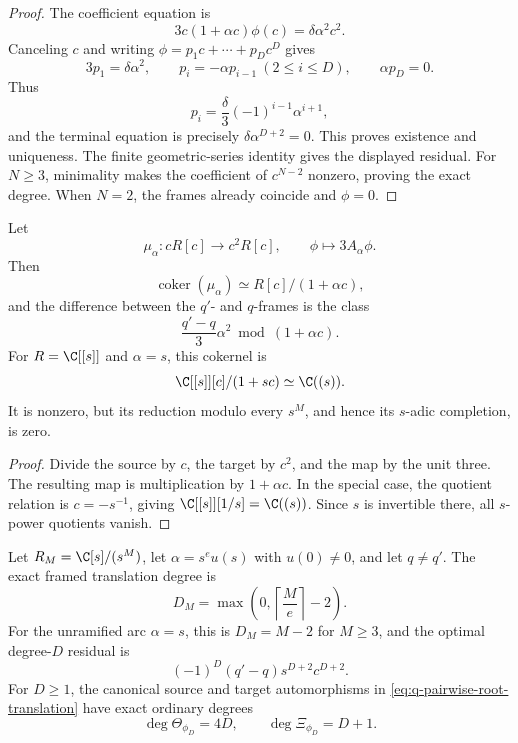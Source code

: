 \begin{proof}
The coefficient equation is
\[
 3c(1+\alpha c)\phi(c)=\delta\alpha^2c^2.
\]
Canceling \(c\) and writing
\(\phi=p_1c+\cdots+p_Dc^D\) gives
\[
 3p_1=\delta\alpha^2,\qquad
 p_i=-\alpha p_{i-1}\ (2\le i\le D),\qquad
 \alpha p_D=0.
\]
Thus
\[
 p_i=\frac\delta3(-1)^{i-1}\alpha^{i+1},
\]
and the terminal equation is precisely
\(\delta\alpha^{D+2}=0\).  This proves existence and uniqueness.  The
finite geometric-series identity gives the displayed residual.  For \(N\ge3\), minimality makes the coefficient of \(c^{N-2}\)
nonzero, proving the exact degree.  When \(N=2\), the frames already
coincide and \(\phi=0\).
\end{proof}

\begin{proposition}
\label{prop:q-framed-orbit-cokernel}
Let
\[
 \mu_\alpha:cR[c]\longrightarrow c^2R[c],
 \qquad \phi\longmapsto3A_\alpha\phi.
\]
Then
\[
 \operatorname{coker}(\mu_\alpha)
 \simeq R[c]/(1+\alpha c),
\]
and the difference between the \(q'\)- and \(q\)-frames is the class
\[
 \frac{q'-q}{3}\alpha^2\bmod(1+\alpha c).
\]
For \(R=\C[[s]]\) and \(\alpha=s\), this cokernel is
\[
 \C[[s]][c]/(1+sc)\simeq\C((s)).
\]
It is nonzero, but its reduction modulo every \(s^M\), and hence its
\(s\)-adic completion, is zero.
\end{proposition}

\begin{proof}
Divide the source by \(c\), the target by \(c^2\), and the map by the unit
three.  The resulting map is multiplication by \(1+\alpha c\).  In the
special case, the quotient relation is \(c=-s^{-1}\), giving
\(\C[[s]][1/s]=\C((s))\).  Since \(s\) is invertible there, all
\(s\)-power quotients vanish.
\end{proof}

\begin{corollary}
\label{cor:q-ramification-degree-law}
Let \(R_M=\C[s]/(s^M)\), let
\(\alpha=s^eu(s)\) with \(u(0)\ne0\), and let \(q\ne q'\).  The exact
framed translation degree is
\[
 D_M=\max\left(0,\left\lceil\frac Me\right\rceil-2\right).
\]
For the unramified arc \(\alpha=s\), this is \(D_M=M-2\) for \(M\ge3\),
and the optimal degree-\(D\) residual is
\[
 (-1)^D(q'-q)s^{D+2}c^{D+2}.
\]
For \(D\ge1\), the canonical source and target automorphisms in
\eqref{eq:q-pairwise-root-translation} have exact ordinary degrees
\[
 \deg\Theta_{\phi_D}=4D,
 \qquad
 \deg\Xi_{\phi_D}=D+1.
\]
\end{corollary}

